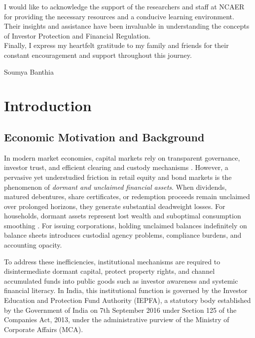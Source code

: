 \documentclass[openany]{book}
\begin{document}
I would like to acknowledge the support of the researchers and staff at NCAER for providing the necessary resources and a conducive learning environment. Their insights and assistance have been invaluable in understanding the concepts of Investor Protection and Financial Regulation.\\
        
Finally, I express my heartfelt gratitude to my family and friends for their constant encouragement and support throughout this journey.
		
		\vfill

        Soumya Banthia \\ 
		\par{}

\tableofcontents
\listoffigures
\listoftables

\chapter{Introduction}

\section{Economic Motivation and Background}
In modern market economies, capital markets rely on transparent governance, investor trust, and efficient clearing and custody mechanisms \cite{guiso2008trusting, zingales2009future}. However, a pervasive yet understudied friction in retail equity and bond markets is the phenomenon of \textit{dormant and unclaimed financial assets}. When dividends, matured debentures, share certificates, or redemption proceeds remain unclaimed over prolonged horizons, they generate substantial deadweight losses. For households, dormant assets represent lost wealth and suboptimal consumption smoothing \cite{campbell2006household}. For issuing corporations, holding unclaimed balances indefinitely on balance sheets introduces custodial agency problems, compliance burdens, and accounting opacity.

To address these inefficiencies, institutional mechanisms are required to disintermediate dormant capital, protect property rights, and channel accumulated funds into public goods such as investor awareness and systemic financial literacy. In India, this institutional function is governed by the Investor Education and Protection Fund Authority (IEPFA), a statutory body established by the Government of India on 7th September 2016 under Section 125 of the Companies Act, 2013, under the administrative purview of the Ministry of Corporate Affairs (MCA).
\end{document}
